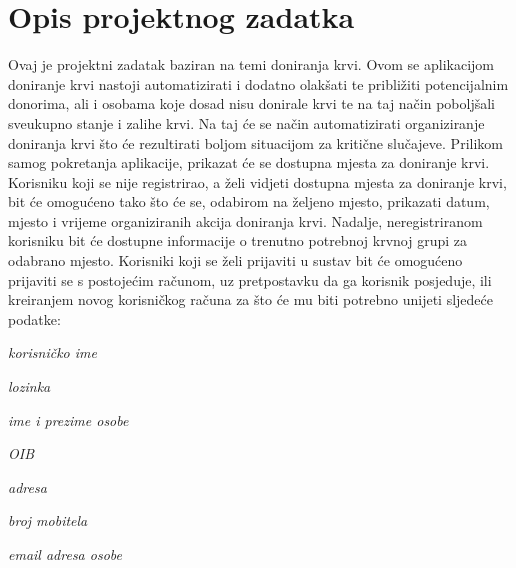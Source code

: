 \chapter{Opis projektnog zadatka}
		
		
    		Ovaj je projektni zadatak baziran na temi doniranja krvi. Ovom se aplikacijom doniranje   krvi nastoji automatizirati i dodatno olakšati te približiti potencijalnim donorima, ali i osobama koje dosad nisu donirale krvi te na taj način poboljšali sveukupno stanje i zalihe krvi. Na taj će se način automatizirati organiziranje doniranja krvi što će rezultirati boljom situacijom za kritične slučajeve. 
        	Prilikom samog pokretanja aplikacije, prikazat će se dostupna mjesta za doniranje krvi. Korisniku koji se nije registrirao, a želi vidjeti dostupna mjesta za doniranje krvi, bit će omogućeno tako što će se, odabirom na željeno mjesto, prikazati datum, mjesto i vrijeme organiziranih akcija doniranja krvi. Nadalje, neregistriranom korisniku bit će dostupne informacije o trenutno potrebnoj krvnoj grupi za odabrano mjesto. Korisniki koji se želi prijaviti u sustav bit će omogućeno prijaviti se s postojećim računom, uz pretpostavku da ga korisnik posjeduje, ili kreiranjem novog korisničkog računa za što će mu biti potrebno unijeti sljedeće podatke:
		\begin{packed_item}
			\item \textit{korisničko ime}
			\item \textit{lozinka}
			\item \textit{ime i prezime osobe}
			\item \textit{OIB}
			\item \textit{adresa}
			\item \textit{broj mobitela}
			\item \textit{email adresa osobe}
		\end{packed_item}
		
